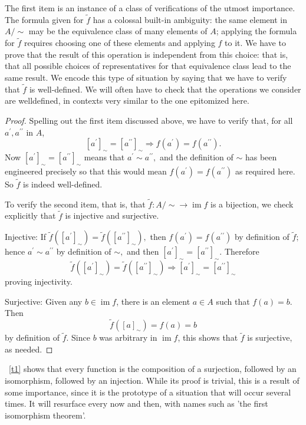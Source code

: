 \documentclass[12pt]{book}
\theoremstyle{definition}\newtheorem{dfn}{Définition}[chapter]
\theoremstyle{plain}\newtheorem{thm}{Théorème}[chapter]
\theoremstyle{plain}\newtheorem{prp}{Proposition}[chapter]
\theoremstyle{plain}\newtheorem{lem}{\bf Lemme}[chapter]
\theoremstyle{plain}\newtheorem{axm}{\bf Axiome}[chapter]
\theoremstyle{plain}\newtheorem{lmm}{\bf Lemme}[chapter]
\theoremstyle{plain}\newtheorem{exm}{\bf Example}[chapter]
\theoremstyle{plain}\newtheorem{cor}{\bf Corollaire}[chapter]
\theoremstyle{remark}\newtheorem{rem}{Remarque}[chapter]
\newcommand{\refthm}[1]{\text{Theorme}\ \ref{#1}}
\begin{document}
The first item is an instance of a class of verifications of the utmost importance. The formula given for $\tilde{f}$ has a colossal built-in ambiguity: the same element in $A / \sim$ may be the equivalence class of many elements of $A$; applying the formula for $\tilde{f}$ requires choosing one of these elements and applying $f$ to it. We have to prove that the result of this operation is independent from this choice: that is, that all possible choices of representatives for that equivalence class lead to the same result. We encode this type of situation by saying that we have to verify that $\tilde{f}$ is well-defined. We will often have to check that the operations we consider are welldefined, in contexts very similar to the one epitomized here.
\begin{proof}

Spelling out the first item discussed above, we have to verify that, for
all $a^{\prime}, a^{\prime \prime}$ in $A$,
$$
\left[a^{\prime}\right]_{\sim}=\left[a^{\prime \prime}\right]_{\sim} \Longrightarrow f\left(a^{\prime}\right)=f\left(a^{\prime \prime}\right) .
$$
Now $\left[a^{\prime}\right]_{\sim}=\left[a^{\prime \prime}\right]_{\sim}$ means that $a^{\prime} \sim a^{\prime \prime},$ and the definition of $\sim$ has been engineered precisely so that this would mean $f\left(a^{\prime}\right)=f\left(a^{\prime \prime}\right)$ as required here. So $\tilde{f}$ is indeed well-defined.

To verify the second item, that is, that $\tilde{f}: A / \sim \rightarrow \operatorname{im} f$ is a bijection, we check explicitly that $\tilde{f}$ is injective and surjective. 

Injective: If $\tilde{f}\left(\left[a^{\prime}\right]_{\sim}\right)=\tilde{f}\left(\left[a^{\prime \prime}\right]_{\sim}\right),$ then $f\left(a^{\prime}\right)=f\left(a^{\prime \prime}\right)$ by definition of $\tilde{f} ;$ hence
$a^{\prime} \sim a^{\prime \prime}$ by definition of $\sim,$ and then $\left[a^{\prime}\right]_{\sim}=\left[a^{\prime \prime}\right]_{\sim} .$ Therefore
$$
\tilde{f}\left(\left[a^{\prime}\right]_{\sim}\right)=\tilde{f}\left(\left[a^{\prime \prime}\right]_{\sim}\right) \Longrightarrow\left[a^{\prime}\right]_{\sim}=\left[a^{\prime \prime}\right]_{\sim}
$$
proving injectivity.

Surjective: Given any $b \in \operatorname{im} f$, there is an element $a \in A$ such that $f(a)=b$. Then
$$
\tilde{f}\left([a]_{\sim}\right)=f(a)=b
$$
by definition of $\tilde{f}$. Since $b$ was arbitrary in $\operatorname{im} f$, this shows that $\tilde{f}$ is surjective, as needed.
\end{proof}
\refthm{t1} shows that every function is the composition of a surjection, followed by an isomorphism, followed by an injection. While its proof is trivial, this is a result of some importance, since it is the prototype of a situation that will occur several times. It will resurface every now and then, with names such as 'the first isomorphism theorem'.
\end{document}
